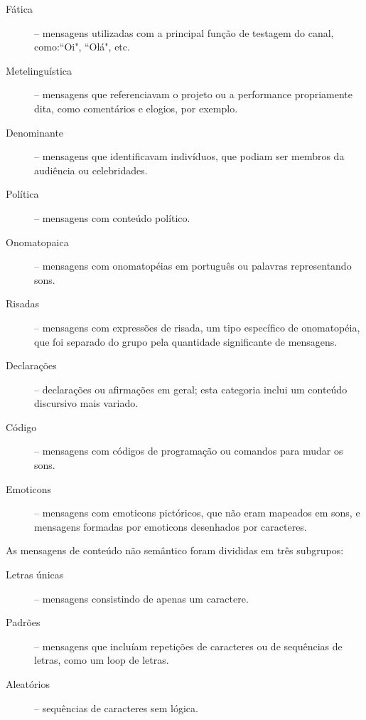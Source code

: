 \begin{description}
\item[Fática] -- mensagens utilizadas com a principal função de testagem do canal, como:``Oi", ``Olá", etc.
\item[Metelinguística] -- mensagens que referenciavam o projeto ou a performance propriamente dita, como comentários e elogios, por exemplo.
\item[Denominante] -- mensagens que identificavam indivíduos, que podiam ser membros da audiência ou celebridades.
\item[Política] -- mensagens com conteúdo político.
\item[Onomatopaica] -- mensagens com onomatopéias em português ou palavras representando sons.
\item[Risadas] -- mensagens com expressões de risada, um tipo específico de onomatopéia, que foi separado do grupo pela quantidade significante de mensagens. 
\item[Declarações] -- declarações ou afirmações em geral; esta categoria inclui um conteúdo discursivo mais variado.
\item[Código] -- mensagens com códigos de programação ou comandos para mudar os sons.
\item[Emoticons] -- mensagens com emoticons pictóricos, que não eram mapeados em sons, e mensagens formadas por emoticons desenhados por caracteres.
\end{description}

As mensagens de conteúdo não semântico foram divididas em três subgrupos:

\begin{description}
\item[Letras únicas] -- mensagens consistindo de apenas um caractere.
\item[Padrões] -- mensagens que incluíam repetições de caracteres ou de sequências de letras, como um loop de letras.
\item[Aleatórios] -- sequências de caracteres sem lógica.
\end{description}


